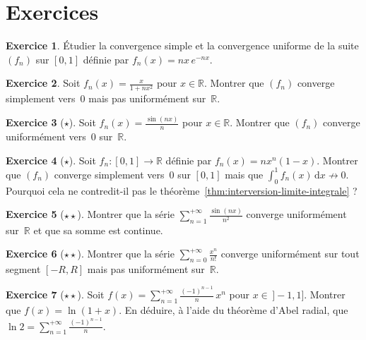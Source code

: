 \documentclass[12pt,a4paper,openany]{book}
\theoremstyle{definition}
\newtheorem{exercice}{Exercice}[chapter]
\newcommand{\R}{\mathbb{R}}
\newcommand{\dd}{\mathrm{d}}
\begin{document}
\section{Exercices}
\label{sec:exercices-chap8}

\begin{exercice}
  Étudier la convergence simple et la convergence uniforme de la suite $(f_n)$ sur $[0,1]$ définie par $f_n(x) = nx\,e^{-nx}$.
\end{exercice}

\begin{exercice}
  Soit $f_n(x) = \frac{x}{1 + nx^2}$ pour $x \in \R$. Montrer que $(f_n)$ converge simplement vers~$0$ mais pas uniformément sur~$\R$.
\end{exercice}

\begin{exercice}[$\star$]
  Soit $f_n(x) = \frac{\sin(nx)}{n}$ pour $x \in \R$. Montrer que $(f_n)$ converge uniformément vers~$0$ sur~$\R$.
\end{exercice}

\begin{exercice}[$\star$]
  Soit $f_n \colon [0,1] \to \R$ définie par $f_n(x) = nx^n(1-x)$. Montrer que $(f_n)$ converge simplement vers~$0$ sur $[0,1]$ mais que $\int_0^1 f_n(x)\,\dd x \not\to 0$. Pourquoi cela ne contredit-il pas le théorème~\ref{thm:interversion-limite-integrale} ?
\end{exercice}

\begin{exercice}[$\star\star$]
  Montrer que la série $\displaystyle\sum_{n=1}^{+\infty}\frac{\sin(nx)}{n^2}$ converge uniformément sur~$\R$ et que sa somme est continue.
\end{exercice}

\begin{exercice}[$\star\star$]
  Montrer que la série $\displaystyle\sum_{n=0}^{+\infty}\frac{x^n}{n!}$ converge uniformément sur tout segment $[-R, R]$ mais pas uniformément sur~$\R$.
\end{exercice}

\begin{exercice}[$\star\star$]
  Soit $f(x) = \displaystyle\sum_{n=1}^{+\infty}\frac{(-1)^{n-1}}{n}\,x^n$ pour $x \in \,]-1, 1]$. Montrer que $f(x) = \ln(1+x)$. En déduire, à l'aide du théorème d'Abel radial, que $\ln 2 = \sum_{n=1}^{+\infty}\frac{(-1)^{n-1}}{n}$.
\end{exercice}
\end{document}
